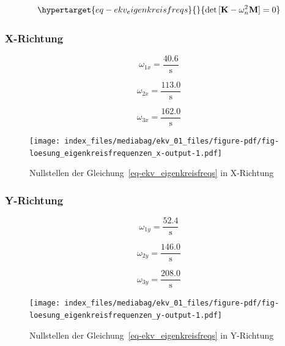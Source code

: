 \documentclass[
  letterpaper,
  DIV=11]{scrreprt}
\begin{document}
\begin{equation}\protect\hypertarget{eq-ekv_eigenkreisfreqs}{}{
\det{[\mathbf{K}-\omega_n^2 \mathbf{M}]=0}
}\label{eq-ekv_eigenkreisfreqs}\end{equation}

\hypertarget{x-richtung-2}{%
\subsubsection{X-Richtung}\label{x-richtung-2}}

\begin{equation}\omega_{1 x} = \frac{40.6}{\text{s}}\end{equation}

\begin{equation}\omega_{2 x} = \frac{113.0}{\text{s}}\end{equation}

\begin{equation}\omega_{3 x} = \frac{162.0}{\text{s}}\end{equation}

\begin{figure}[H]

{\centering \texttt{[image: index\_files/mediabag/ekv\_01\_files/figure-pdf/fig-loesung\_eigenkreisfrequenzen\_x-output-1.pdf]}

}

\caption{\label{fig-loesung_eigenkreisfrequenzen_x}Nullstellen der
Gleichung~\ref{eq-ekv_eigenkreisfreqs} in X-Richtung}

\end{figure}

\hypertarget{y-richtung-2}{%
\subsubsection{Y-Richtung}\label{y-richtung-2}}

\begin{equation}\omega_{1 y} = \frac{52.4}{\text{s}}\end{equation}

\begin{equation}\omega_{2 y} = \frac{146.0}{\text{s}}\end{equation}

\begin{equation}\omega_{3 y} = \frac{208.0}{\text{s}}\end{equation}

\begin{figure}[H]

{\centering \texttt{[image: index\_files/mediabag/ekv\_01\_files/figure-pdf/fig-loesung\_eigenkreisfrequenzen\_y-output-1.pdf]}

}

\caption{\label{fig-loesung_eigenkreisfrequenzen_y}Nullstellen der
Gleichung~\ref{eq-ekv_eigenkreisfreqs} in Y-Richtung}

\end{figure}
\end{document}
